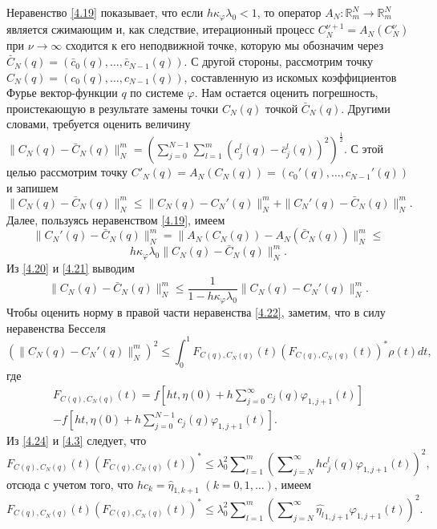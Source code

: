 Неравенство \eqref{4.19} показывает, что если $h\kappa_\varphi\lambda_0<1$, то оператор  $A_N:\mathbb{R}^N_m\to \mathbb{R}^N_m$ является сжимающим и, как следствие, итерационный процесс $C_N^{\nu+1}=A_N(C_N^{\nu})$  при $\nu\to\infty$ сходится к его неподвижной точке, которую мы обозначим через  $\bar C_N(q)=(\bar c_0(q),\ldots,\bar c_{N-1}(q))$. С другой стороны, рассмотрим точку $C_N(q)=(c_0(q),\ldots,c_{N-1}(q))$, составленную из искомых коэффициентов Фурье вектор-функции $q$ по системе $\varphi$. Нам остается оценить погрешность, проистекающую в результате замены точки $C_N(q)$ точкой $\bar C_N(q)$. Другими словами, требуется оценить величину
$\|C_N(q)-\bar C_N(q)\|_N^m= \left(\sum_{j=0}^{N-1}\sum\nolimits_{l=1}^m(c_j^l(q)-\bar c_j^l(q))^2\right)^\frac12$. С этой целью рассмотрим точку $C'_N(q)=A_N(C_N(q))=(c_0'(q),\ldots,c_{N-1}'(q))$ и запишем
\begin{equation}\label{4.20}
\|C_N(q)-\bar C_N(q)\|_N^m\le \|C_N(q)- C_N'(q)\|_N^m+\|C_N'(q)-\bar C_N(q)\|_N^m.
\end{equation}
Далее, пользуясь неравенством \eqref{4.19}, имеем
$$
\|C_N'(q)-\bar C_N(q)\|_N^m=\|A_N(C_N(q))-A_N(\bar C_N(q))\|_N^m\le
$$
\begin{equation}\label{4.21}
h\kappa_\varphi\lambda_0\|C_N(q)-\bar C_N(q)\|_N^m.
\end{equation}
Из \eqref{4.20} и \eqref{4.21} выводим
\begin{equation}\label{4.22}
\|C_N(q)-\bar C_N(q)\|_N^m\le \frac1{1-h\kappa_\varphi\lambda_0}\|C_N(q)- C_N'(q)\|_N^m.
\end{equation}
Чтобы оценить норму в правой части неравенства \eqref{4.22}, заметим, что в силу неравенства Бесселя
\begin{equation}\label{4.23}
(\|C_N(q)- C_N'(q)\|_N^m)^2\le \int_{0}^1F_{C(q),C_N(q)}(t)(F_{C(q),C_N(q)}(t))^*\rho(t) dt,
\end{equation}
где
\begin{multline}\label{4.24}
F_{C(q),C_N(q)}(t)=f\left[ht,\eta(0)+ h\sum\nolimits_{j=0}^\infty c_j(q)\varphi_{1,j+1}(t)\right] \\
-f\left[ht,\eta(0)+ h\sum\nolimits_{j=0}^{N-1}c_j(q)\varphi_{1,j+1}(t)\right].
\end{multline}
Из \eqref{4.24} и \eqref{4.3} следует, что
$$
F_{C(q),C_N(q)}(t)(F_{C(q),C_N(q)}(t))^*\le \lambda_0^2 \sum\nolimits_{l=1}^m  \left(\sum\nolimits_{j=N}^\infty hc_j^l(q)\varphi_{1,j+1}(t)\right)^2,
$$
отсюда с учетом того, что $hc_k=\hat \eta_{1,k+1}$ $(k=0,1,\ldots)$, имеем
\begin{equation}\label{4.25}
F_{C(q),C_N(q)}(t)(F_{C(q),C_N(q)}(t))^*\le \lambda_0^2   \sum\nolimits_{l=1}^m \left(\sum\nolimits_{j=N}^\infty  \widehat {\eta_l}_{1,j+1}\varphi_{1,j+1}(t)\right)^2.
\end{equation}
